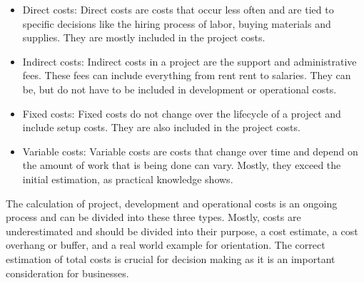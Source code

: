 \begin{itemize}
    \item Direct costs: Direct costs are costs that occur less often and are tied to specific decisions like the hiring process of labor, buying materials and supplies. They are mostly included in the project costs.  
    \item Indirect costs: Indirect costs in a project are the support and administrative fees. These fees can include everything from rent rent to salaries. They can be, but do not have to be included in development or operational costs. 
    \item Fixed costs: Fixed costs do not change over the lifecycle of a project and include setup costs. They are also included in the project costs.
    \item Variable costs: Variable costs are costs that change over time and depend on the amount of work that is being done can vary. Mostly, they exceed the initial estimation, as practical knowledge shows.  
\end{itemize}

The calculation of project, development and operational costs is an ongoing process and can be divided into these three types. Mostly, costs are underestimated and should be divided into their purpose, a cost estimate, a cost overhang or buffer, and a real world example for orientation. The correct estimation of total costs is crucial for decision making as it is an important consideration for businesses. \cite{schwartz_project_2023}

